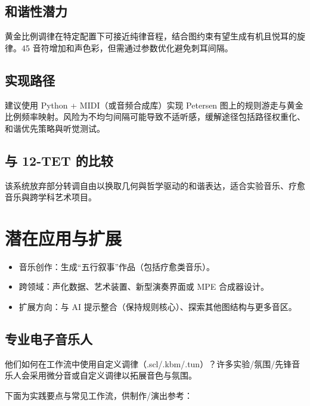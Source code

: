 \documentclass{article}
\begin{document}
\subsection{和谐性潜力}
黄金比例调律在特定配置下可接近纯律音程，结合图约束有望生成有机且悦耳的旋律。45 音符增加和声色彩，但需通过参数优化避免刺耳间隔。

\subsection{实现路径}
建议使用 Python + MIDI（或音频合成库）实现 Petersen 图上的规则游走与黄金比例频率映射。风险为不均匀间隔可能导致不适听感，缓解途径包括路径权重化、和谐优先策略與听觉测试。

\subsection{与 12-TET 的比较}
该系统放弃部分转调自由以换取几何與哲学驱动的和谐表达，适合实验音乐、疗愈音乐與跨学科艺术项目。

\section{潜在应用与扩展}
\begin{itemize}
  \item 音乐创作：生成“五行叙事”作品（包括疗愈类音乐）。
  \item 跨领域：声化数据、艺术装置、新型演奏界面或 MPE 合成器设计。
  \item 扩展方向：与 AI 提示整合（保持规则核心）、探索其他图结构与更多音区。
\end{itemize}

\subsection{专业电子音乐人}
他们如何在工作流中使用自定义调律（.scl/.kbm/.tun）？许多实验/氛围/先锋音乐人会采用微分音或自定义调律以拓展音色与氛围。

下面为实践要点与常见工作流，供制作/演出参考：
\end{document}

